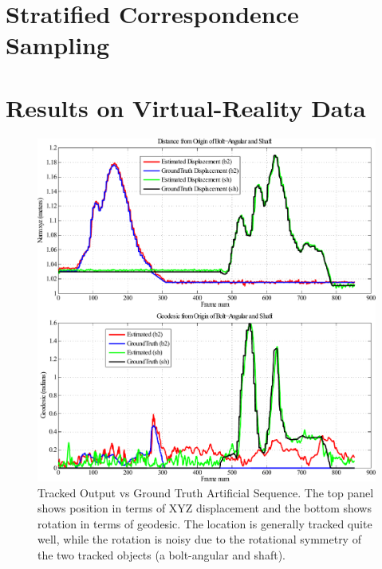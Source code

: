 \section{Stratified Correspondence Sampling}
\section{Results on Virtual-Reality Data}
\begin{figure}[!ht]
  \centering
  \includegraphics[width=\linewidth]{figures/Tracking/CombinedNoNoise.pdf}
  \caption[Tracked Output vs Ground Truth Artificial Sequence]{Tracked Output vs Ground Truth Artificial Sequence. The top panel shows position in terms of XYZ displacement and the bottom shows rotation in terms of geodesic. The location is generally tracked quite well, while the rotation is noisy due to the rotational symmetry of the two tracked objects (a bolt-angular and shaft).}
  \label{fig:CombinedNoNoise}
\end{figure}


